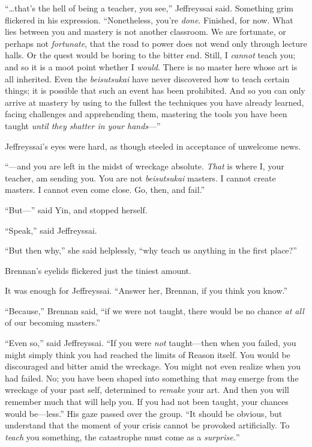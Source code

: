 {
 ``\ldots that's the hell of being
a teacher, you see,'' Jeffreyssai said. Something
grim flickered in his expression. ``Nonetheless,
you're \textit{done}. Finished, for now. What lies
between you and mastery is not another classroom. We are fortunate, or
perhaps not \textit{fortunate}, that the road to power does not wend
only through lecture halls. Or the quest would be boring to the bitter
end. Still, I \textit{cannot} teach you; and so it is a moot point
whether I \textit{would}. There is no master here whose art is all
inherited. Even the \textit{beisutsukai} have never discovered how to
teach certain things; it is possible that such an event has been
prohibited. And so you can only arrive at mastery by using to the
fullest the techniques you have already learned, facing challenges and
apprehending them, mastering the tools you have been taught
\textit{until they shatter in your hands}{}---''}

{
 Jeffreyssai's eyes were hard, as though steeled in
acceptance of unwelcome news.}

{
 ``---and you are left in the midst of wreckage
absolute. \textit{That} is where I, your teacher, am sending you. You
are not \textit{beisutsukai} masters. I cannot create masters. I cannot
even come close. Go, then, and fail.''}

{
 ``But---'' said Yin, and
stopped herself.}

{
 ``Speak,'' said Jeffreyssai.}

{
 ``But then why,'' she said
helplessly, ``why teach us anything in the first
place?''}

{
 Brennan's eyelids flickered just the tiniest
amount.}

{
 It was enough for Jeffreyssai. ``Answer her,
Brennan, if you think you know.''}

{
 ``Because,'' Brennan said,
``if we were not taught, there would be no chance
\textit{at all} of our becoming masters.''}

{
 ``Even so,'' said Jeffreyssai.
``If you were \textit{not} taught---then when you
failed, you might simply think you had reached the limits of Reason
itself. You would be discouraged and bitter amid the wreckage. You
might not even realize when you had failed. No; you have been shaped
into something that \textit{may} emerge from the wreckage of your past
self, determined to \textit{remake} your art. And then you will
remember much that will help you. If you had not been taught, your
chances would be---less.'' His gaze passed over the
group. ``It should be obvious, but understand that the
moment of your crisis cannot be provoked artificially. To
\textit{teach} you something, the catastrophe must come as a
\textit{surprise.}''}

